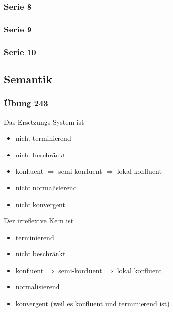 \documentclass[
  a4paper,
  11pt,
]{scrartcl}
\begin{document}



\subsubsection{Serie 8}
\label{sub:serie_8}




\subsubsection{Serie 9}
\label{sub:serie_9}




\subsubsection{Serie 10}
\label{sub:serie_10}



\subsection{Semantik}
\label{sec:semantik}

\subsubsection{Übung 243}
\label{ssub:uebung_243}

Das Ersetzungs-System ist
\begin{itemize}
  \item nicht terminierend
  \item nicht beschränkt
  \item konfluent $\Rightarrow$ semi-konfluent $\Rightarrow$ lokal konfluent
  \item nicht normalisierend
  \item nicht konvergent
\end{itemize}

Der irreflexive Kern ist
\begin{itemize}
  \item terminierend
  \item nicht beschränkt
  \item konfluent $\Rightarrow$ semi-konfluent $\Rightarrow$ lokal konfluent
  \item normalisierend
  \item konvergent (weil es konfluent und terminierend ist)
\end{itemize}
\end{document}
